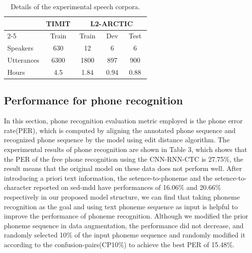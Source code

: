 \documentclass[a4paper]{article}
\begin{document}
\begin{table}[H]
\caption{Details of the experimental speech corpora.}
    \centering
    \renewcommand\arraystretch{1.5}
\begin{tabular}{|l|c|c|c|c|} 
\hline
           & TIMIT & \multicolumn{3}{l|}{~ ~ L2-ARCTIC~ ~}  \\ 
\cline{2-5  }
   & Train & Train & Dev  & Test                    \\ 
\hline
Speakers   & 630 &  12 &  6 & 6                    \\ 
\hline
Utterances & 6300  & 1800  & 897  & 900                     \\ 
\hline
Hours      & 4.5   & 1.84  & 0.94 & 0.88                    \\
\hline
\end{tabular}
    \label{tab:data split}
\end{table}



\subsection{Performance for phone recognition}
In this section, phone recognition evaluation metric employed is the phone error rate(PER), which is computed by aligning the annotated phone sequence and recognized phone sequence by the model using edit distance algorithm. The experimental results of phone recognition are shown in Table 3, which shows that the PER of the free phone recognition using the CNN-RNN-CTC is 27.75\%, the result means that the original model on these data does not perform well. After introducing a priori text information, the setence-to-phoneme and the setence-to-character reported on sed-mdd have performances of 16.06\% and 20.66\% respectively in our proposed model structure, we can find that taking phoneme recognition as the goal and using text phoneme sequence as input is helpful to improve the performance of phoneme recognition. Although we modified the prior phoneme sequence in data augmentation, the performance did not decrease, and randomly selected 10\% of the input phoneme sequence and randomly modified it according to the confusion-pairs(CP10\%) to achieve the best PER of 15.48\%.
\end{document}
